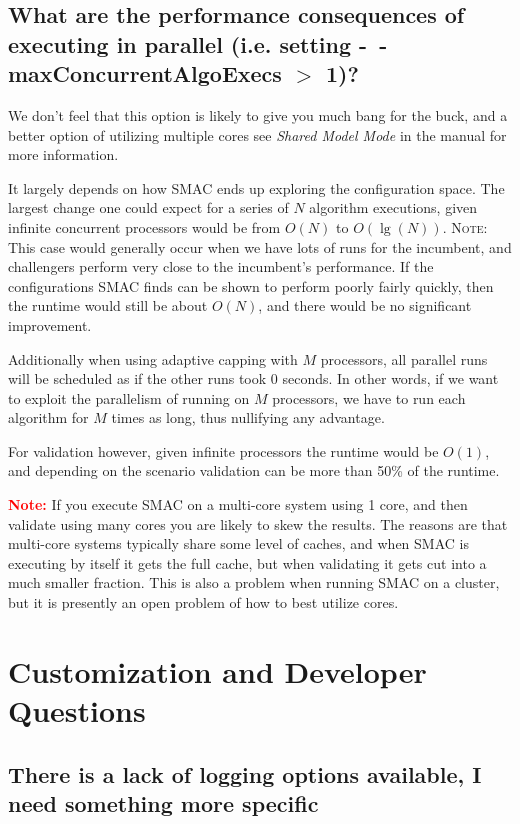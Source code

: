 \documentclass[11pt,letterpaper,oneside]{article}
\begin{document}
\subsection{What are the performance consequences of executing in parallel (i.e. setting \textbf{-~$\!$-maxConcurrentAlgoExecs} $>$ 1)?}
	
		We don't feel that this option is likely to give you much bang for the buck, and a better option of utilizing multiple cores see \emph{Shared Model Mode} in the manual for more information.
		
	It largely depends on how SMAC ends up exploring the configuration space. The largest change one could expect for a series of $N$ algorithm executions, given infinite concurrent processors would be from $O(N)$ to $O(\lg(N))$. \textsc{Note:} This case would generally occur when we have lots of runs for the incumbent, and challengers perform very close to the incumbent's performance. If the configurations SMAC finds can be shown to perform poorly fairly quickly, then the runtime would still be about $O(N)$, and there would be no significant improvement.
	
	Additionally when using adaptive capping with $M$ processors, all parallel runs will be scheduled as if the other runs took 0 seconds. In other words, if we want to exploit the parallelism of running on $M$ processors, we have to run each algorithm for $M$ times as long, thus nullifying any advantage.
	
	For validation however, given infinite processors the runtime would be $O(1)$, and depending on the scenario validation can be more than 50\% of the runtime. 
	
	\vspace{10pt}
	
	\textcolor{red}{\textbf{Note:}} If you execute SMAC on a multi-core system using 1 core, and then validate using many cores you are likely to skew the results. The reasons are that multi-core systems typically share some level of caches, and when SMAC is executing by itself it gets the full cache, but when validating it gets cut into a much smaller fraction. This is also a problem when running SMAC on a cluster, but it is presently an open problem of how to best utilize cores.

\section{Customization and Developer Questions}

\subsection{There is a lack of logging options available, I need something more specific}
\label{sec:alternative-logging}
	
\end{document}
